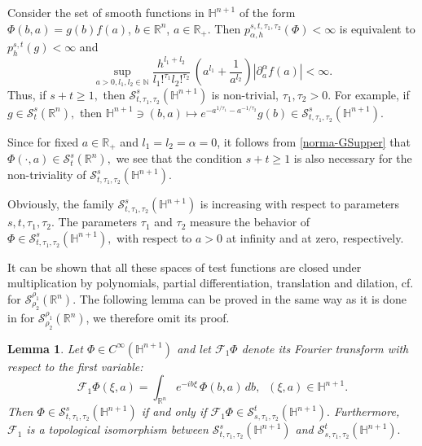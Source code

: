 \documentclass[reqno,12pt]{amsart}
\theoremstyle{plain}
\newtheorem{lemma}{Lemma}
\theoremstyle{definition}
\theoremstyle{remark}
\begin{document}
Consider the set of smooth functions in $\mathbb H^{n+1}$ of the form
$\Phi(b,a)=g(b)f(a)$, $b\in\mathbb R^n$, $a\in\mathbb R_+.$
Then  $ p_{\alpha, h}^{s, t, \tau_1, \tau_2} (\Phi)<\infty $ is equivalent to
$ p^{s,t}_h(g)<\infty $ and
\begin{equation}\label{dod1}
\sup_{a>0,l_1,l_2\in \mathbb N}
\frac{h^{l_1 + l_2}}{ l_1!^{\tau_1}
l_2!^{\tau_2}} \, \left(a^{l_1} + \frac{1}{a^{l_2}}\right) |\partial_a^{\alpha}
 f(a)|< \infty.
\end{equation}
Thus, if $s+t\geq 1,$ then $ \mathcal{S}^{s}_{t,\tau_1, \tau_2} (\mathbb{H}^{n+1}) $ is non-trivial,
$\tau_1, \tau_2 > 0 $.
For example, if $g \in\mathcal S^s_t(\mathbb R^n),$ then
$ \mathbb H^{n+1}\ni(b,a)\mapsto e^{-a^{1/\tau_1} -a^{-1/\tau_2}} g(b) \in
\mathcal{S}^{s}_{t,\tau_1, \tau_2} (\mathbb{H}^{n+1}) $.

Since for fixed $a \in\mathbb R_+ $ and $ l_1 = l_2 = \alpha = 0 $,
it follows from \eqref{norma-GSupper} that $  \Phi (\cdot , a) \in \mathcal{S}^s_t(\mathbb R^n),$
we see that the condition
$s+t\geq 1$ is also necessary for the non-triviality of
$ \mathcal{S}^{s}_{t,\tau_1, \tau_2} (\mathbb{H}^{n+1}). $

\par

Obviously, the family $ \mathcal{S}^{s}_{t,\tau_1, \tau_2} (\mathbb{H}^{n+1}) $ is increasing with
respect to parameters $ s,t, \tau_1, \tau_2 $. The parameters $ \tau_1 $ and $\tau_2 $
measure the behavior of $ \Phi \in \mathcal{S}^{s}_{t, \tau_1, \tau_2} (\mathbb{H}^{n+1}), $
with respect to $a>0$ at infinity and at zero, respectively.

\par

It can be shown that all these spaces of test functions
are closed under multiplication by polynomials, partial differentiation,
translation and  dilation, cf. \cite{GS} for $ \mathcal{S}_{{\rho_2}}^{{\rho_1}}
(\mathbb{R}^n) $.
The following lemma can be proved in the same way as it is done in
\cite[Chapter IV 6.2]{GS} for $ \mathcal{S}_{{\rho_2}}^{{\rho_1}} (\mathbb{R}^n)$, we therefore omit its proof.

\begin{lemma} \label{FTH}
Let  $ \Phi  \in C^\infty  (\mathbb{H}^{n+1}) $ and let
$ \mathcal{F}_1 \Phi $ denote its Fourier transform  with respect to the first variable:
$$
\mathcal{F}_1 \Phi (\xi, a) = \int_{\mathbb{R}^n} e^{- i b
\xi} \, \Phi (b, a) \, db, \; \; (\xi, a) \in \mathbb{H}^{n+1}.
$$
Then $ \Phi  \in {\mathcal S}^{s}_{t, \tau_1, \tau_2} (\mathbb{H}^{n+1}) $ if and only if
$ \mathcal{F}_1 \Phi \in  {\mathcal S}^{t}_{s, \tau_1, \tau_2} (\mathbb{H}^{n+1}).$
Furthermore, $ \mathcal{F}_1 $ is a topological isomorphism between
$ {\mathcal S}^{s}_{t, \tau_1, \tau_2} (\mathbb{H}^{n+1}) $ and
$ {\mathcal S}^{t}_{s, \tau_1, \tau_2} (\mathbb{H}^{n+1}). $
\end{lemma}
\end{document}
